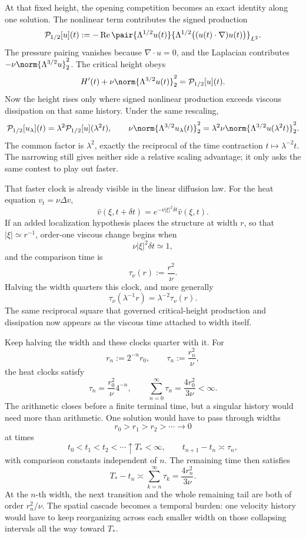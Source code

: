 
At that fixed height, the opening competition becomes an exact identity along one solution. The nonlinear term contributes the signed production
\[
  \mathcal P_{1/2}[u](t)
  :=
  -\operatorname{Re}
  \pair
    {\Lambda^{1/2}u(t)}
    {\Lambda^{1/2}\bigl((u(t)\cdot\nabla)u(t)\bigr)}_{L^2}.
\]
The pressure pairing vanishes because \(\nabla\cdot u=0\), and the Laplacian contributes \(-\nu\norm{\Lambda^{3/2}u}_2^2\). The critical height obeys
\[
  H'(t)
  +
  \nu\norm{\Lambda^{3/2}u(t)}_2^2
  =
  \mathcal P_{1/2}[u](t).
\]
Now the height rises only where signed nonlinear production exceeds viscous dissipation on that same history. Under the same rescaling,
\[
  \mathcal P_{1/2}[u_\lambda](t)
  =
  \lambda^2\mathcal P_{1/2}[u](\lambda^2t),
  \qquad
  \nu\norm{\Lambda^{3/2}u_\lambda(t)}_2^2
  =
  \lambda^2\nu\norm{\Lambda^{3/2}u(\lambda^2t)}_2^2.
\]
The common factor is \(\lambda^2\), exactly the reciprocal of the time contraction \(t\mapsto\lambda^{-2}t\). The narrowing still gives neither side a relative scaling advantage; it only asks the same contest to play out faster.


That faster clock is already visible in the linear diffusion law. For the heat equation \(v_t=\nu\Delta v\),
\[
  \widehat v(\xi,t+\delta t)
  =
  e^{-\nu|\xi|^2\delta t}\widehat v(\xi,t).
\]
If an added localization hypothesis places the structure at width \(r\), so that \(|\xi|\simeq r^{-1}\), order-one viscous change begins when
\[
  \nu|\xi|^2\delta t\simeq1,
\]
and the comparison time is
\[
  \tau_\nu(r)
  :=
  \frac{r^2}{\nu}.
\]
Halving the width quarters this clock, and more generally
\[
  \tau_\nu(\lambda^{-1}r)
  =
  \lambda^{-2}\tau_\nu(r).
\]
The same reciprocal square that governed critical-height production and dissipation now appears as the viscous time attached to width itself.


Keep halving the width and these clocks quarter with it. For
\[
  r_n:=2^{-n}r_0,
  \qquad
  \tau_n:=\frac{r_n^2}{\nu},
\]
the heat clocks satisfy
\[
  \tau_n
  =
  \frac{r_0^2}{\nu}4^{-n},
  \qquad
  \sum_{n=0}^{\infty}\tau_n
  =
  \frac{4r_0^2}{3\nu}
  <
  \infty.
\]
The arithmetic closes before a finite terminal time, but a singular history would need more than arithmetic. One \NavierStokes{} solution would have to pass through widths
\[
  r_0>r_1>r_2>\cdots\longrightarrow0
\]
at times
\[
  t_0<t_1<t_2<\cdots\uparrow T_*<\infty,
  \qquad
  t_{n+1}-t_n\asymp\tau_n,
\]
with comparison constants independent of \(n\). The remaining time then satisfies
\[
  T_*-t_n
  \asymp
  \sum_{k=n}^{\infty}\tau_k
  =
  \frac{4r_n^2}{3\nu}.
\]
At the \(n\)-th width, the next transition and the whole remaining tail are both of order \(r_n^2/\nu\). The spatial cascade becomes a temporal burden: one velocity history would have to keep reorganizing across each smaller width on those collapsing intervals all the way toward \(T_*\).